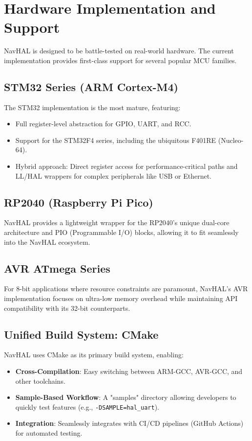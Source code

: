 \section{Hardware Implementation and Support}
\label{sec:hardware}

NavHAL is designed to be battle-tested on real-world hardware. The current implementation provides first-class support for several popular MCU families.

\subsection{STM32 Series (ARM Cortex-M4)}
The STM32 implementation is the most mature, featuring:
\begin{itemize}
    \item Full register-level abstraction for GPIO, UART, and RCC.
    \item Support for the STM32F4 series, including the ubiquitous F401RE (Nucleo-64).
    \item Hybrid approach: Direct register access for performance-critical paths and LL/HAL wrappers for complex peripherals like USB or Ethernet.
\end{itemize}

\subsection{RP2040 (Raspberry Pi Pico)}
NavHAL provides a lightweight wrapper for the RP2040's unique dual-core architecture and PIO (Programmable I/O) blocks, allowing it to fit seamlessly into the NavHAL ecosystem.

\subsection{AVR ATmega Series}
For 8-bit applications where resource constraints are paramount, NavHAL's AVR implementation focuses on ultra-low memory overhead while maintaining API compatibility with its 32-bit counterparts.

\subsection{Unified Build System: CMake}
NavHAL uses CMake as its primary build system, enabling:
\begin{itemize}
    \item \textbf{Cross-Compilation}: Easy switching between ARM-GCC, AVR-GCC, and other toolchains.
    \item \textbf{Sample-Based Workflow}: A "samples" directory allowing developers to quickly test features (e.g., \texttt{-DSAMPLE=hal\_uart}).
    \item \textbf{Integration}: Seamlessly integrates with CI/CD pipelines (GitHub Actions) for automated testing.
\end{itemize}
